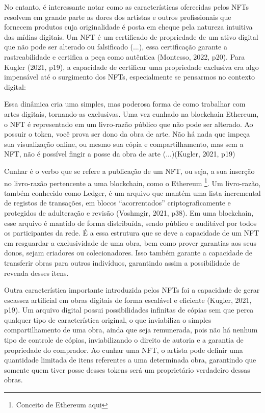 No entanto, é interessante notar como as características oferecidas pelos NFTs resolvem em grande parte as dores dos artistas e outros profissionais que fornecem produtos cuja originalidade é posta em cheque pela natureza intuitiva das mídias digitais. Um NFT é um certificado de propriedade de um ativo digital que não pode ser alterado ou falsificado (...), essa certificação garante a rastreabilidade e certifica a peça como autêntica (Montesso, 2022, p20). Para Kugler (2021, p19), a capacidade de certificar uma propriedade exclusiva era algo impensável até o surgimento dos NFTs, especialmente se pensarmos no contexto digital: 

\begin{citacao}
Essa dinâmica cria uma simples, mas poderosa forma de como trabalhar com artes digitais, tornando-as exclusivas. Uma vez cunhado na blockchain Ethereum, o NFT é representado em um livro-razão público que não pode ser alterado. Ao possuir o token, você prova ser dono da obra de arte. Não há nada que impeça sua visualização online, ou mesmo sua cópia e compartilhamento, mas sem a NFT, não é possível fingir a posse da obra de arte (...)(Kugler, 2021, p19)	
\end{citacao}

Cunhar é o verbo que se refere a publicação de um NFT, ou seja, a sua inserção no livro-razão pertencente a uma blockchain, como o Ethereum \footnote{Conceito de Ethereum aqui}. Um livro-razão, também conhecido como Ledger, é um arquivo que mantém uma lista incremental de registos de transações, em blocos “acorrentados” criptograficamente e protegidos de adulteração e revisão (Voshmgir, 2021, p38). Em uma blockchain, esse arquivo é mantido de forma distribuída, sendo público e auditável por todos os participantes da rede. É a essa estrutura que se deve a capacidade de um NFT em resguardar a exclusividade de uma obra, bem como prover garantias aos seus donos, sejam criadores ou colecionadores. Isso também garante a capacidade de transferir obras para outros indivíduos, garantindo assim a possibilidade de revenda desses itens.

Outra característica importante introduzida pelos NFTs foi a capacidade de gerar escassez artificial em obras digitais de forma escalável e eficiente (Kugler, 2021, p19). Um arquivo digital possui possibilidades infinitas de cópias sem que perca qualquer tipo de característica original, o que inviabiliza o simples compartilhamento de uma obra, ainda que seja remunerada, pois não há nenhum tipo de controle de cópias, inviabilizando o direito de autoria e a garantia de propriedade do comprador. Ao cunhar uma NFT, o artista pode definir uma quantidade limitada de itens referentes a uma determinada obra, garantindo que somente quem tiver posse desses tokens será um proprietário verdadeiro dessas obras. 

